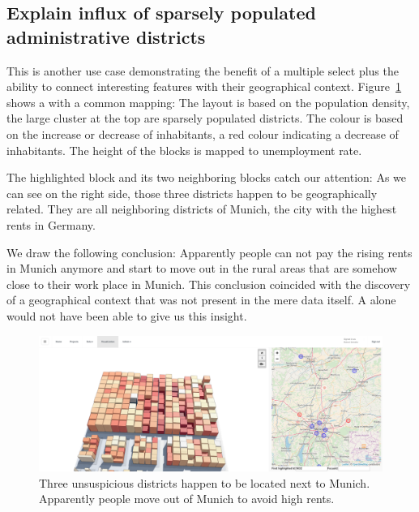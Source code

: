 \subsection{Explain influx of sparsely populated administrative districts}

This is another use case demonstrating the benefit of a multiple select plus the ability to connect interesting features with their geographical context.
Figure~\ref{fig:evaluation:cases:wahlkreise_multiselect} shows a \tmap{} with a common mapping:
The layout is based on the population density, the large cluster at the top are sparsely populated districts.
The colour is based on the increase or decrease of inhabitants, a red colour indicating a decrease of inhabitants.
The height of the blocks is mapped to unemployment rate.

The highlighted block and its two neighboring blocks catch our attention:
As we can see on the right side, those three districts happen to be geographically related.
They are all neighboring districts of Munich, the city with the highest rents in Germany.

We draw the following conclusion:
Apparently people can not pay the rising rents in Munich anymore and start to move out in the rural areas that are somehow close to their work place in Munich.
This conclusion coincided with the discovery of a geographical context that was not present in the mere data itself.
A \tmap{} alone would not have been able to give us this insight.

\begin{figure}[h]
  \centering
  \includegraphics[width=\textwidth]{figures/evaluation/cases/wahlkreise_multiselect}
  \caption{
    Three unsuspicious districts happen to be located next to Munich.
    Apparently people move out of Munich to avoid high rents.
  }\label{fig:evaluation:cases:wahlkreise_multiselect}
\end{figure}





